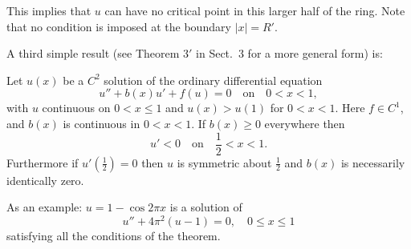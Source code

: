 This implies that $u$ can have no critical point in this larger half of the ring. 
Note that no condition is imposed at the boundary $|x|=R'$.

A third simple result (see Theorem 3$'$ in Sect.~3 for a more general form) is:

\begin{theorem}\label{thm:3}
  Let $u(x)$ be a $C^2$ solution of the ordinary differential equation
  \begin{equation}\label{eq:1.3}
    u'' + b(x)u' + f(u) = 0\quad \text{on} \quad 0<x<1,
  \end{equation}
  with $u$ continuous on $0<x\leq 1$ and $u(x)>u(1)$ for $0<x<1$.
  Here $f\in C^1$, and $b(x)$ is continuous in $0<x<1$.
  If $b(x)\geq 0$ everywhere then
  \begin{equation}\label{eq:1.4}
    u' < 0\quad \text{on} \quad \frac12 < x < 1.
  \end{equation}
  Furthermore if $u'(\frac12) = 0$ then $u$ is symmetric about $\frac12$
  and $b(x)$ is necessarily identically zero.
\end{theorem}

As an example: $u = 1 - \cos 2\pi x$ is a solution of
\[u'' + 4\pi^2(u-1) = 0, \quad 0\leq x\leq 1\]
satisfying all the conditions of the theorem.

